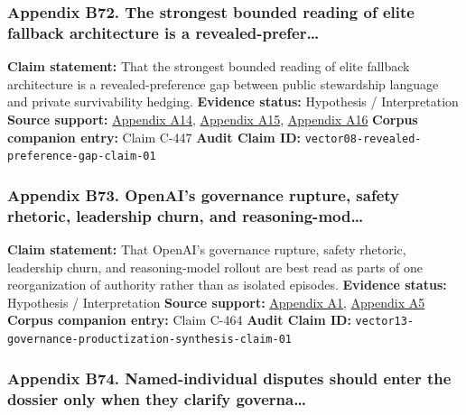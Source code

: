 \documentclass[
  american,
  11pt,
  letterpaper,
]{article}
\begin{document}
\subsubsection{Appendix B72. The strongest bounded reading of elite
fallback architecture is a
revealed-prefer\ldots{}}\label{appendix-b72-the-strongest-bounded-reading-of-elite-fallback-architecture-is-a-revealed-prefer}

\textbf{Claim statement:} That the strongest bounded reading of elite
fallback architecture is a revealed-preference gap between public
stewardship language and private survivability hedging. \textbf{Evidence
status:} Hypothesis / Interpretation \textbf{Source support:}
\hyperref[appendix-a14-sam-altman-s-manifest-destiny]{Appendix A14},
\hyperref[appendix-a15-inside-mark-zuckerbergs-top-secret-hawaii-compound]{Appendix
A15},
\hyperref[appendix-a16-mark-zuckerberg-downplays-his-5-000-square-foot-underground-bunker-in-hawaii-just-a-little-shelter]{Appendix
A16} \textbf{Corpus companion entry:} Claim C-447 \textbf{Audit Claim
ID:} \texttt{vector08-revealed-preference-gap-claim-01}

\subsubsection{Appendix B73. OpenAI's governance rupture, safety
rhetoric, leadership churn, and
reasoning-mod\ldots{}}\label{appendix-b73-openai-s-governance-rupture-safety-rhetoric-leadership-churn-and-reasoning-mod}

\textbf{Claim statement:} That OpenAI's governance rupture, safety
rhetoric, leadership churn, and reasoning-model rollout are best read as
parts of one reorganization of authority rather than as isolated
episodes. \textbf{Evidence status:} Hypothesis / Interpretation
\textbf{Source support:}
\hyperref[appendix-a1-openai-announces-leadership-transition]{Appendix
A1},
\hyperref[appendix-a5-openai-board-forms-safety-and-security-committee]{Appendix
A5} \textbf{Corpus companion entry:} Claim C-464 \textbf{Audit Claim
ID:} \texttt{vector13-governance-productization-synthesis-claim-01}

\subsubsection{Appendix B74. Named-individual disputes should enter the
dossier only when they clarify
governa\ldots{}}\label{appendix-b74-named-individual-disputes-should-enter-the-dossier-only-when-they-clarify-governa}
\end{document}
